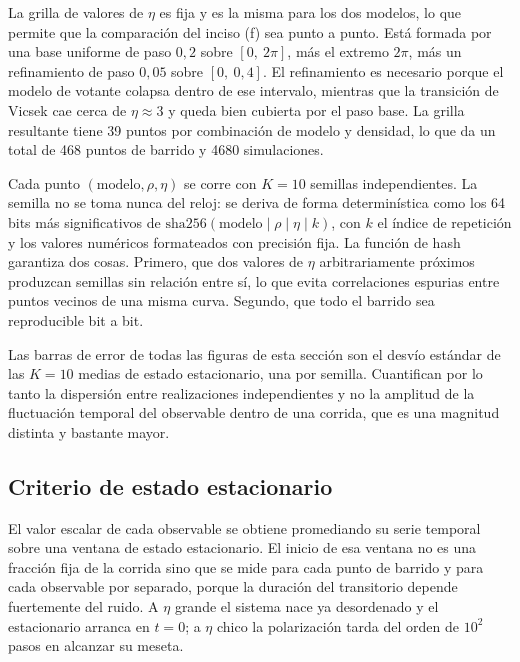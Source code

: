 \documentclass[11pt]{article}
\begin{document}
La grilla de valores de $\eta$ es fija y es la misma para los dos modelos, lo
que permite que la comparación del inciso (f) sea punto a punto. Está formada
por una base uniforme de paso $0{,}2$ sobre $[0,\ 2\pi]$, más el extremo
$2\pi$, más un refinamiento de paso $0{,}05$ sobre $[0,\ 0{,}4]$. El
refinamiento es necesario porque el modelo de votante colapsa dentro de ese
intervalo, mientras que la transición de Vicsek cae cerca de $\eta \approx 3$ y
queda bien cubierta por el paso base. La grilla resultante tiene 39 puntos por
combinación de modelo y densidad, lo que da un total de 468 puntos de barrido y
4680 simulaciones.

Cada punto $(\text{modelo}, \rho, \eta)$ se corre con $K = 10$ semillas
independientes. La semilla no se toma nunca del reloj: se deriva de forma
determinística como los 64 bits más significativos de
$\mathrm{sha256}(\text{modelo} \mid \rho \mid \eta \mid k)$, con $k$ el índice
de repetición y los valores numéricos formateados con precisión fija. La función
de hash garantiza dos cosas. Primero, que dos valores de $\eta$ arbitrariamente
próximos produzcan semillas sin relación entre sí, lo que evita correlaciones
espurias entre puntos vecinos de una misma curva. Segundo, que todo el barrido
sea reproducible bit a bit.

Las barras de error de todas las figuras de esta sección son el desvío estándar
de las $K = 10$ medias de estado estacionario, una por semilla. Cuantifican por
lo tanto la dispersión entre realizaciones independientes y no la amplitud de la
fluctuación temporal del observable dentro de una corrida, que es una magnitud
distinta y bastante mayor.

\subsection{Criterio de estado estacionario}
\label{sec:estacionario}

El valor escalar de cada observable se obtiene promediando su serie temporal
sobre una ventana de estado estacionario. El inicio de esa ventana no es una
fracción fija de la corrida sino que se mide para cada punto de barrido y para
cada observable por separado, porque la duración del transitorio depende
fuertemente del ruido. A $\eta$ grande el sistema nace ya desordenado y el
estacionario arranca en $t = 0$; a $\eta$ chico la polarización tarda del orden
de $10^2$ pasos en alcanzar su meseta.
\end{document}
